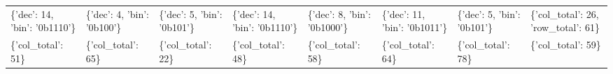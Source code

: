 \begin{tabular}{llllllll}
 \{'dec': 14, 'bin': '0b1110'\}     & \{'dec': 4, 'bin': '0b100'\}   & \{'dec': 5, 'bin': '0b101'\}        & \{'dec': 14, 'bin': '0b1110'\}       & \{'dec': 8, 'bin': '0b1000'\}        & \{'dec': 11, 'bin': '0b1011'\} & \{'dec': 5, 'bin': '0b101'\}   & \{'col\_total': 26, 'row\_total': 61\} \\
 \{'col\_total': 51\}                & \{'col\_total': 65\}            & \{'col\_total': 22\}                 & \{'col\_total': 48\}                  & \{'col\_total': 58\}                  & \{'col\_total': 64\}            & \{'col\_total': 78\}            & \{'col\_total': 59\}                  \\
\hline
\end{tabular}